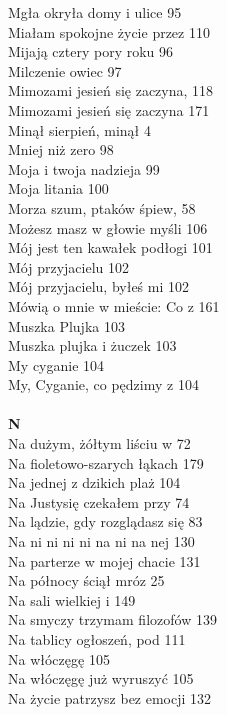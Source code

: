 \documentclass[a5paper, 10pt]{book}
\begin{document}
{\begin{multicols}{3}
    Mgła okryła domy i ulice 95\\
    Miałam spokojne życie przez 110\\
    Mijają cztery pory roku 96\\
    Milczenie owiec 97\\
    Mimozami jesień się zaczyna, 118\\
    Mimozami jesień się zaczyna 171\\
    Minął sierpień, minął 4\\
    Mniej niż zero 98\\
    Moja i twoja nadzieja 99\\
    Moja litania 100\\
    Morza szum, ptaków śpiew, 58\\
    Możesz masz w głowie myśli 106\\
    Mój jest ten kawałek podłogi 101\\
    Mój przyjacielu 102\\
    Mój przyjacielu, byłeś mi 102\\
    Mówią o mnie w mieście: Co z 161\\
    Muszka Plujka 103\\
    Muszka plujka i żuczek 103\\
    My cyganie 104\\
    My, Cyganie, co pędzimy z 104\\
    \\
    {\footnotesize \textbf{N\\} }
    Na dużym, żółtym liściu w 72\\
    Na fioletowo-szarych łąkach 179\\
    Na jednej z dzikich plaż 104\\
    Na Justysię czekałem przy 74\\
    Na lądzie, gdy rozglądasz się 83\\
    Na ni ni ni ni na ni na nej 130\\
    Na parterze w mojej chacie 131\\
    Na północy ściął mróz 25\\
    Na sali wielkiej i 149\\
    Na smyczy trzymam filozofów 139\\
    Na tablicy ogłoszeń, pod 111\\
    Na włóczęgę 105\\
    Na włóczęgę już wyruszyć 105\\
    Na życie patrzysz bez emocji 132\\

\end{multicols}}
\end{document}
